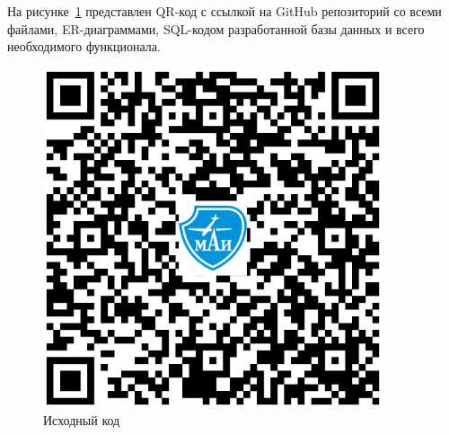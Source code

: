 
На рисунке~\ref{fig:a1} представлен QR-код с ссылкой на GitHub репозиторий со всеми файлами, ER-диаграммами, SQL-кодом разработанной базы данных и всего необходимого функционала.

\begin{figure}
    \includegraphics[width=10cm]{inc/QR-code_tree}
    \caption{Исходный код}
    \label{fig:a1}
\end{figure}